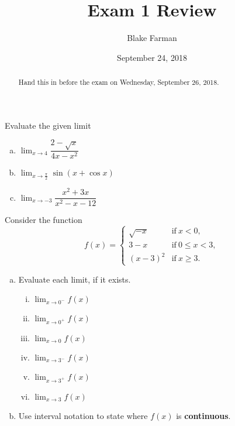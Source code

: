 \documentclass[10pt]{amsart}
\title[Review]{Exam 1 Review}
\date{September 24, 2018}
\author{Blake Farman}
\begin{document}
\maketitle

\begin{abstract}
  Hand this in before the exam on Wednesday, September 26, 2018.
\end{abstract}
\makenameslot

\begin{thm}
  Evaluate the given limit
  \begin{multicols}{3}
    \begin{enumerate}[(a)]
    \item
      \(\displaystyle{\lim_{x\to 4} \dfrac{2-\sqrt{x}}{4x-x^2}}\)
    \item
      \(\displaystyle{\lim_{x\to \frac{\pi}{2}} \sin(x+\cos x)}\)
    \item
      \(\displaystyle{\lim_{x\to -3}\dfrac{x^2+3x}{x^2-x-12}}\)
    \end{enumerate}
  \end{multicols}
\end{thm}

\newpage

\begin{thm}
  Consider the function
  \[
  f(x) = \left\{\begin{array}{ll}
  \sqrt{-x} & \text{if}\ x< 0, \\
  3-x & \text{if}\ 0\leq x< 3, \\
  (x-3)^2 & \text{if}\ x\geq 3.
  \end{array}
  \right.
  \]
  \begin{enumerate}[(a)]
  \item Evaluate each limit, if it exists.
    \begin{multicols}{3}
      \begin{enumerate}[(i)]
      \item
        $\lim_{x\to 0^-} f(x)$
        \vspace{1in}
      \item
        $\lim_{x\to 0^+} f(x)$
        \vspace{1in}
      \item
        $\lim_{x\to 0} f(x)$
        \vspace{1in}
      \item
        $\lim_{x\to 3^-} f(x)$
        \vspace{1in}
      \item
        $\lim_{x\to 3^+} f(x)$
        \vspace{1in}
      \item
        $\lim_{x\to 3} f(x)$
        \vspace{1in}
      \end{enumerate}
    \end{multicols}
  \item Use interval notation to state where $f(x)$ is \textbf{continuous}.
    \vspace{1 in}
  \end{enumerate}
\end{thm}
\end{document}
